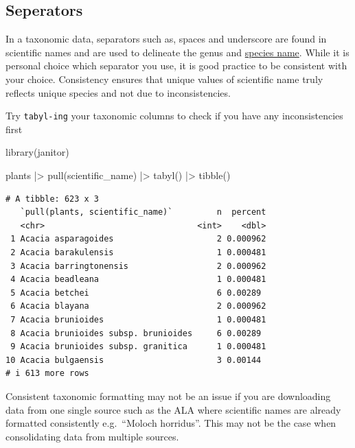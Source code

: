 \documentclass[
  letterpaper,
  DIV=11,
  numbers=noendperiod,
  oneside]{scrreprt}
\newenvironment{Shaded}{\begin{snugshade}}{\end{snugshade}}
\newcommand{\FunctionTok}[1]{\textcolor[rgb]{0.28,0.35,0.67}{#1}}
\newcommand{\NormalTok}[1]{\textcolor[rgb]{0.00,0.23,0.31}{#1}}
\newcommand{\SpecialCharTok}[1]{\textcolor[rgb]{0.37,0.37,0.37}{#1}}
\begin{document}
\hypertarget{seperators}{%
\subsection{Seperators}\label{seperators}}

In a taxonomic data, separators such as, spaces and underscore are found
in scientific names and are used to delineate the genus and
\href{https://dwc.tdwg.org/terms/\#dwc:specificEpithet}{species name}.
While it is personal choice which separator you use, it is good practice
to be consistent with your choice. Consistency ensures that unique
values of scientific name truly reflects unique species and not due to
inconsistencies.

Try \texttt{tabyl-ing} your taxonomic columns to check if you have any
inconsistencies first

\begin{Shaded}
\begin{Highlighting}[]
\FunctionTok{library}\NormalTok{(janitor)}

\NormalTok{plants }\SpecialCharTok{|\textgreater{}} 
  \FunctionTok{pull}\NormalTok{(scientific\_name) }\SpecialCharTok{|\textgreater{}} 
  \FunctionTok{tabyl}\NormalTok{() }\SpecialCharTok{|\textgreater{}} 
  \FunctionTok{tibble}\NormalTok{()}
\end{Highlighting}
\end{Shaded}

\begin{verbatim}
# A tibble: 623 x 3
   `pull(plants, scientific_name)`         n  percent
   <chr>                               <int>    <dbl>
 1 Acacia asparagoides                     2 0.000962
 2 Acacia barakulensis                     1 0.000481
 3 Acacia barringtonensis                  2 0.000962
 4 Acacia beadleana                        1 0.000481
 5 Acacia betchei                          6 0.00289 
 6 Acacia blayana                          2 0.000962
 7 Acacia brunioides                       1 0.000481
 8 Acacia brunioides subsp. brunioides     6 0.00289 
 9 Acacia brunioides subsp. granitica      1 0.000481
10 Acacia bulgaensis                       3 0.00144 
# i 613 more rows
\end{verbatim}

Consistent taxonomic formatting may not be an issue if you are
downloading data from one single source such as the ALA where scientific
names are already formatted consistently e.g.~``Moloch horridus''. This
may not be the case when consolidating data from multiple sources.
\end{document}

